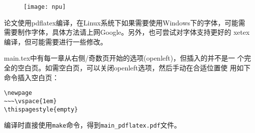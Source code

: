 \begin{figure}[htbp]
\centering
\texttt{[image: npu]}
\label{fig:intro-npu}
\end{figure}


论文使用pdflatex编译，在Linux系统下如果需要使用Windows下的字体，可能需
需要制作字体，具体方法请上网Google。另外，也可尝试对字体支持更好的
xetex编译，但可能需要进行一些修改。

main.tex中有每一章从右侧/奇数页开始的选项(openleft)，但插入的并不是一
个完全的空白页。如需空白页，可以关闭openleft选项，然后手动在合适位置使
用如下命令插入空白页：
\begin{verbatim}
\newpage
~~~\vspace{1em}
\thispagestyle{empty}
\end{verbatim}

编译时直接使用\texttt{make}命令，得到\texttt{main\_pdflatex.pdf}文件。

